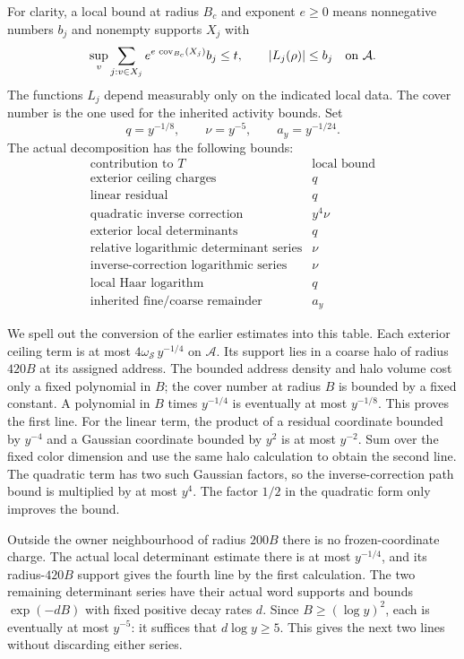For clarity, a local bound at radius $B_c$ and exponent $e\ge0$
means nonnegative numbers $b_j$ and nonempty supports $X_j$ with
\begin{equation}\label{eq:actual-body-local-price}
 \sup_v\sum_{j:v\in X_j}
       e^{e\,\operatorname{cov}_{B_c}(X_j)}b_j\le t,
 \qquad |L_j(\rho)|\le b_j\quad\hbox{on }\mathcal A.
\end{equation}
The functions $L_j$ depend measurably only on the indicated local
data. The cover number is the one used for the inherited activity
bounds. Set
\[
 q=y^{-1/8},\qquad \nu=y^{-5},\qquad a_y=y^{-1/24}.
\]
The actual decomposition has the following bounds:
\[
\begin{array}{l|c}
 \text{contribution to }T&\text{local bound}\\ \hline
 \text{exterior ceiling charges}&q\\
 \text{linear residual}&q\\
 \text{quadratic inverse correction}&y^4\nu\\
 \text{exterior local determinants}&q\\
 \text{relative logarithmic determinant series}&\nu\\
 \text{inverse-correction logarithmic series}&\nu\\
 \text{local Haar logarithm}&q\\
 \text{inherited fine/coarse remainder}&a_y
\end{array}
\]

We spell out the conversion of the earlier estimates into this
table. Each exterior ceiling term is at most
$4\omega_{\mathcal S}\,y^{-1/4}$ on $\mathcal A$.
Its support lies in a coarse halo of radius $420B$ at its
assigned address. The bounded address density and halo volume
cost only a fixed polynomial in $B$; the cover number at radius
$B$ is bounded by a fixed constant. A polynomial in $B$ times
$y^{-1/4}$ is eventually at most $y^{-1/8}$. This proves the
first line. For the linear term, the product of a residual
coordinate bounded by $y^{-4}$ and a Gaussian coordinate
bounded by $y^2$ is at most $y^{-2}$. Sum over the fixed color
dimension and use the same halo calculation to obtain the second
line. The quadratic term has two such Gaussian factors, so the
inverse-correction path bound is multiplied by at most $y^4$.
The factor $1/2$ in the quadratic form only improves the bound.

Outside the owner neighbourhood of radius $200B$ there is no
frozen-coordinate charge. The actual local determinant estimate
there is at most $y^{-1/4}$, and its radius-$420B$ support
gives the fourth line by the first calculation. The two remaining
determinant series have their actual word supports and bounds
$\exp(-dB)$ with fixed positive decay rates $d$. Since
$B\ge(\log y)^2$, each is eventually at most $y^{-5}$:
it suffices that $d\log y\ge5$. This gives the next two
lines without discarding either series.

